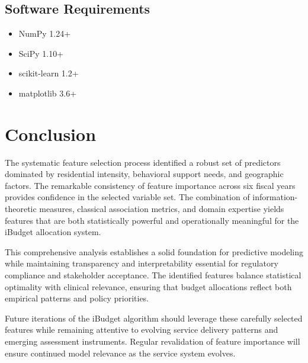 \subsection{Software Requirements}

\begin{itemize}
    \item NumPy 1.24+
    \item SciPy 1.10+
    \item scikit-learn 1.2+
    \item matplotlib 3.6+
\end{itemize}

\section{Conclusion}

The systematic feature selection process identified a robust set of predictors dominated by residential intensity, behavioral support needs, and geographic factors. The remarkable consistency of feature importance across six fiscal years provides confidence in the selected variable set. The combination of information-theoretic measures, classical association metrics, and domain expertise yields features that are both statistically powerful and operationally meaningful for the iBudget allocation system.

This comprehensive analysis establishes a solid foundation for predictive modeling while maintaining transparency and interpretability essential for regulatory compliance and stakeholder acceptance. The identified features balance statistical optimality with clinical relevance, ensuring that budget allocations reflect both empirical patterns and policy priorities.

Future iterations of the iBudget algorithm should leverage these carefully selected features while remaining attentive to evolving service delivery patterns and emerging assessment instruments. Regular revalidation of feature importance will ensure continued model relevance as the service system evolves.

